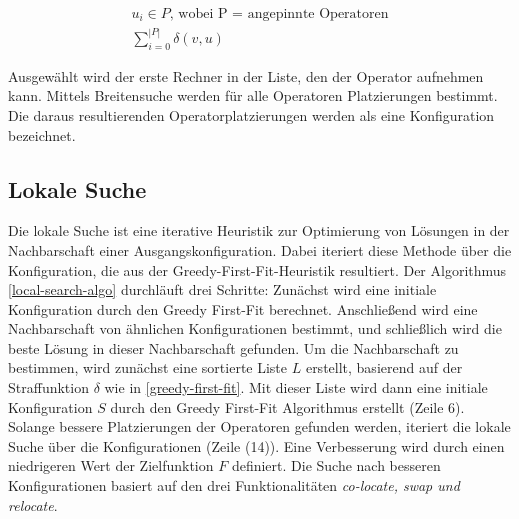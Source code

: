 \documentclass{article}
\begin{document}
\[ 
    \begin{gathered}
        u_i \in P \text{, wobei P = angepinnte Operatoren} \\
        \sum_{i=0}^{|P|} \delta(v, u)
    \end{gathered} 
\] 

Ausgewählt wird der erste Rechner in der Liste, den der Operator aufnehmen kann. Mittels Breitensuche werden für alle Operatoren Platzierungen bestimmt. 
Die daraus resultierenden Operatorplatzierungen werden als eine Konfiguration bezeichnet.



\newpage
\subsection{Lokale Suche} \label{local-search}
Die lokale Suche ist eine iterative Heuristik zur Optimierung von Lösungen in der Nachbarschaft einer Ausgangskonfiguration. 
Dabei iteriert diese Methode über die Konfiguration, die aus der Greedy-First-Fit-Heuristik resultiert. 
Der Algorithmus \ref{local-search-algo} durchläuft drei Schritte: 
Zunächst wird eine initiale Konfiguration durch den Greedy First-Fit berechnet. 
Anschließend wird eine Nachbarschaft von ähnlichen Konfigurationen bestimmt, und schließlich wird die beste Lösung in dieser Nachbarschaft gefunden.
Um die Nachbarschaft zu bestimmen, wird zunächst eine sortierte Liste $L$ erstellt, basierend auf der Straffunktion $\delta$ wie in \ref{greedy-first-fit}.
Mit dieser Liste wird dann eine initiale Konfiguration $S$ durch den Greedy First-Fit Algorithmus erstellt (Zeile 6). \\


Solange bessere Platzierungen der Operatoren gefunden werden, iteriert die lokale Suche über die Konfigurationen  (Zeile (14)). 
Eine Verbesserung wird durch einen niedrigeren Wert der Zielfunktion $F$ definiert. 
Die Suche nach besseren Konfigurationen basiert auf den drei Funktionalitäten \textit{co-locate, swap und relocate}. \\
\end{document}
